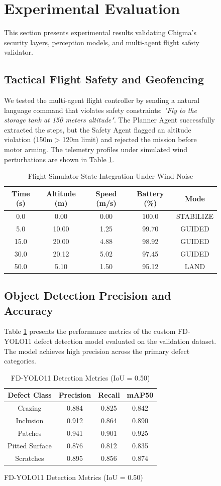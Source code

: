 \documentclass[conference]{IEEEtran}
\begin{document}
\begin{figure}[t]
\section{Experimental Evaluation}
This section presents experimental results validating Chigma's security layers, perception models, and multi-agent flight safety validator.

\subsection{Tactical Flight Safety and Geofencing}
We tested the multi-agent flight controller by sending a natural language command that violates safety constraints: \textit{"Fly to the storage tank at 150 meters altitude"}. 
The Planner Agent successfully extracted the steps, but the Safety Agent flagged an altitude violation (150m > 120m limit) and rejected the mission before motor arming.
The telemetry profiles under simulated wind perturbations are shown in Table \ref{tab:physics}.

\begin{table}[h]
\centering
\caption{Flight Simulator State Integration Under Wind Noise}
\label{tab:physics}
\begin{tabular}{ccccc}
\toprule
Time (s) & Altitude (m) & Speed (m/s) & Battery (\%) & Mode \\
\midrule
0.0  & 0.00  & 0.00 & 100.0 & STABILIZE \\
5.0  & 10.00 & 1.25 & 99.70 & GUIDED \\
15.0 & 20.00 & 4.88 & 98.92 & GUIDED \\
30.0 & 20.12 & 5.02 & 97.45 & GUIDED \\
50.0 & 5.10  & 1.50 & 95.12 & LAND \\
\bottomrule
\end{tabular}
\end{table}

\subsection{Object Detection Precision and Accuracy}
Table \ref{tab:yolo} presents the performance metrics of the custom FD-YOLO11 defect detection model evaluated on the validation dataset. The model achieves high precision across the primary defect categories.

\begin{table}[h]
\centering
\caption{FD-YOLO11 Detection Metrics (IoU = 0.50)}
\label{tab:yolo}
\begin{tabular}{cccc}
\toprule
Defect Class & Precision & Recall & mAP50 \\
\midrule
Crazing         & 0.884 & 0.825 & 0.842 \\
Inclusion       & 0.912 & 0.864 & 0.890 \\
Patches         & 0.941 & 0.901 & 0.925 \\
Pitted Surface  & 0.876 & 0.812 & 0.835 \\
Scratches       & 0.895 & 0.856 & 0.874 \\
\bottomrule
\end{tabular}
\end{table}


\end{figure}
\end{document}

